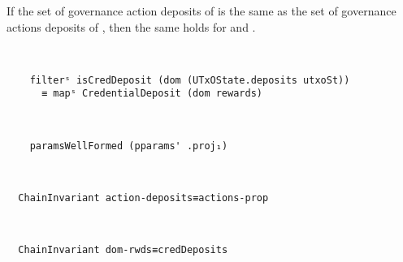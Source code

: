 \begin{itemize}
\begin{property}
  If the set of governance action deposits of  is the same as the set of
  governance actions deposits of , then the same holds for  and .
  \end{property}

  \begin{property}\

  \begin{verbatim}
    filterˢ isCredDeposit (dom (UTxOState.deposits utxoSt)) 
      ≡ mapˢ CredentialDeposit (dom rewards)
  \end{verbatim}
  \end{property}

  \begin{property}\

  \begin{verbatim}
    paramsWellFormed (pparams' .proj₁)
  \end{verbatim}
  \end{property}


  \begin{property}\

  \begin{verbatim}
  ChainInvariant action-deposits≡actions-prop
  \end{verbatim}
  \end{property}


  \begin{property}\

  \begin{verbatim}
  ChainInvariant dom-rwds≡credDeposits
  \end{verbatim}
  \end{property}


  \begin{property}\


\end{property}
\end{itemize}

